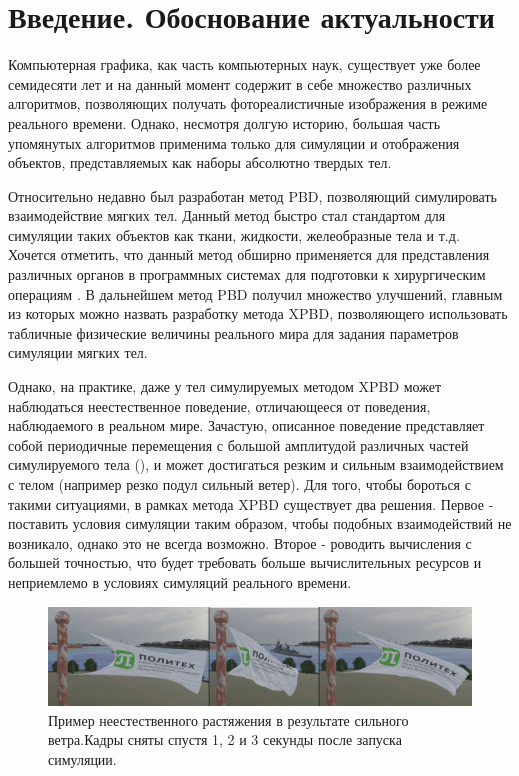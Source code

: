 \chapter*{Введение. Обоснование актуальности} %

Компьютерная графика, как часть компьютерных наук, существует уже более семидесяти лет и на данный момент содержит в себе множество различных алгоритмов, позволяющих получать фотореалистичные изображения в режиме реального времени. Однако, несмотря долгую историю, большая часть упомянутых алгоритмов применима только для симуляции и отображения объектов, представляемых как наборы абсолютно твердых тел. 

Относительно недавно был разработан метод PBD\cite{pbd}, позволяющий симулировать взаимодействие мягких тел. Данный метод быстро стал стандартом для симуляции таких объектов как ткани, жидкости, желеобразные тела и т.д. Хочется отметить, что данный метод обширно применяется для представления различных органов в программных системах для подготовки к хирургическим операциям \cite{li2022position}. В дальнейшем метод PBD получил множество улучшений, главным из которых можно назвать разработку метода XPBD\cite{xpbd}, позволяющего использовать табличные физические величины реального мира для задания параметров симуляции мягких тел.

Однако, на практике, даже у тел симулируемых методом XPBD может наблюдаться неестественное поведение, отличающееся от поведения, наблюдаемого в реальном мире. Зачастую, описанное поведение представляет собой периодичные перемещения с большой амплитудой различных частей симулируемого тела (), и может достигаться резким и сильным взаимодействием с телом (например резко подул сильный ветер). Для того, чтобы бороться с такими ситуациями, в рамках метода XPBD существует два решения. Первое - поставить условия симуляции таким образом, чтобы подобных взаимодействий не возникало, однако это не всегда возможно. Второе - 
роводить вычисления с большей точностью, что будет требовать больше вычислительных ресурсов и неприемлемо в условиях симуляций реального времени. 

\begin{figure}[ht!] 
	\center
	\includegraphics [scale=0.2] {my_folder/images//streching}
	\caption{Пример неестественного растяжения в результате сильного ветра.\newline Кадры сняты спустя 1, 2 и 3 секунды после запуска симуляции.}
	\label{fig:streching}  
\end{figure}

